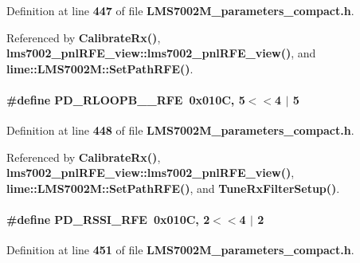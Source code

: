 Definition at line {\bf 447} of file {\bf L\+M\+S7002\+M\+\_\+parameters\+\_\+compact.\+h}.



Referenced by {\bf Calibrate\+Rx()}, {\bf lms7002\+\_\+pnl\+R\+F\+E\+\_\+view\+::lms7002\+\_\+pnl\+R\+F\+E\+\_\+view()}, and {\bf lime\+::\+L\+M\+S7002\+M\+::\+Set\+Path\+R\+F\+E()}.

\paragraph[{P\+D\+\_\+\+R\+L\+O\+O\+P\+B\+\_\+2\+\_\+\+R\+FE}]{\setlength{\rightskip}{0pt plus 5cm}\#define P\+D\+\_\+\+R\+L\+O\+O\+P\+B\+\_\+\_\+\+R\+FE~0x010\+C, 5$<$$<$4 $\vert$  5}\label{LMS7002M__parameters__compact_8h_a4e2d7756db1d372b2ac8baab919c4c7d}


Definition at line {\bf 448} of file {\bf L\+M\+S7002\+M\+\_\+parameters\+\_\+compact.\+h}.



Referenced by {\bf Calibrate\+Rx()}, {\bf lms7002\+\_\+pnl\+R\+F\+E\+\_\+view\+::lms7002\+\_\+pnl\+R\+F\+E\+\_\+view()}, {\bf lime\+::\+L\+M\+S7002\+M\+::\+Set\+Path\+R\+F\+E()}, and {\bf Tune\+Rx\+Filter\+Setup()}.

\paragraph[{P\+D\+\_\+\+R\+S\+S\+I\+\_\+\+R\+FE}]{\setlength{\rightskip}{0pt plus 5cm}\#define P\+D\+\_\+\+R\+S\+S\+I\+\_\+\+R\+FE~0x010\+C, 2$<$$<$4 $\vert$  2}\label{LMS7002M__parameters__compact_8h_a93cb4d581c244553a395fd52e2dcc999}


Definition at line {\bf 451} of file {\bf L\+M\+S7002\+M\+\_\+parameters\+\_\+compact.\+h}.



